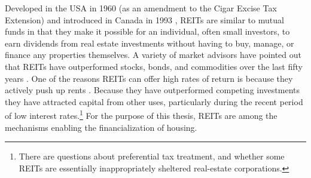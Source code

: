 Developed in the USA  in 1960 (as an amendment to the Cigar Excise Tax Extension) and introduced in Canada in 1993 \cite{batRolePublicREITs2022}, REITs are similar to mutual funds in that they make it possible for an individual, often small investors, to earn dividends from real estate investments without having to buy, manage, or finance any properties themselves. 
A variety of market advisors have pointed out that  REITs have outperformed stocks, bonds, and commodities  over the last fifty years %
\cite{changREITsOutperformStocks2008, blockInvestingREITsReal2012, chanRiskReturnReal1990}. %
One of the reasons REITs can offer high rates of return is because they actively push up rents %
\cite{augustGentrificationSuburbanDecline2018, farhaReportFinancializationHousing2017}. 
 Because they have outperformed competing investments they have attracted capital from other uses, particularly during the recent period of low interest rates.\footnote{There are questions about preferential tax treatment, and whether some REITs are essentially inappropriately sheltered real-estate corporations.} For the purpose of this thesis, REITs are among the mechanisms enabling the financialization of housing.





